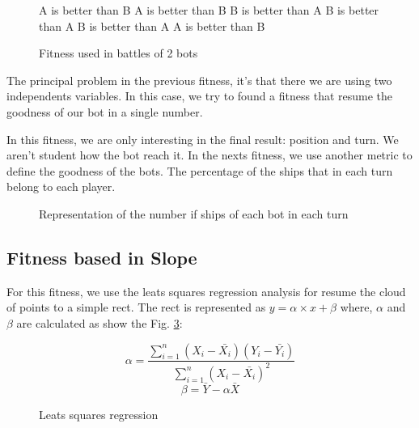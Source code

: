 \documentclass{llncs}
\begin{document}
\begin{figure}
\begin{algorithmic}
    	\State A is better than B
    	\State A is better than B
    \Else
    	\State B is better than A
    \EndIf
\Else
    	\State B is better than A
    	\State B is better than A
    \Else
    	\State A is better than B
    \EndIf
\EndIf
\end{algorithmic}
\caption{Fitness used in battles of 2 bots}
\label{fig:fitness_clasico}
\end{figure}



The principal problem in the previous fitness, it's that there we are using two independents variables. In this case, we try to found a fitness that resume the goodness of our bot in a single number. %

In this fitness, we are only interesting in the final result: position and turn. We aren't student how the bot reach it. In the nexts fitness, we use another metric to define the goodness of the bots. The percentage of the ships that in each turn belong to each player.

\begin{figure}
\begin{center}
\end{center}
\caption{Representation of the number if ships of each bot in each turn} 
\label{figura:nubecita}
\end{figure}

\subsection{Fitness based in Slope}

For this fitness, we use the leats squares regression analysis for resume the cloud of points to a simple rect. The rect is represented as {$y = \alpha \times x + \beta $} where, {$\alpha$} and {$\beta$} are calculated as show the Fig. \ref{equation:LeatsSqueares}:

\begin{figure}
	\begin{equation}
		\alpha = \frac{\sum_{i=1}^{n}(X_{i} - \bar{X_{i}})(Y_{i} - \bar{Y_{i}})}{\sum_{i=1}^{n}(X_{i} - \bar{X_{i}})^{2}}
	\end{equation}
	\begin{equation}
		\beta = \bar{Y}-\alpha\bar{X}
	\end{equation}
	\caption{Leats squares regression}
	\label{equation:LeatsSqueares}
\end{figure}
\end{document}
